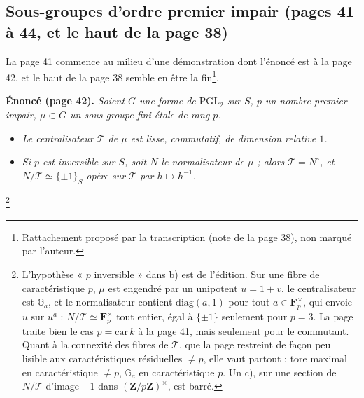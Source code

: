 \documentclass[11pt,a4paper]{article}
\begin{document}
\subsection*{Sous-groupes d'ordre premier impair (pages 41 à 44, et le haut de la page 38)}

La page 41 commence au milieu d'une démonstration dont l'énoncé est à la page
42, et le haut de la page 38 semble en être la fin\footnote{Rattachement proposé
par la transcription (note de la page 38), non marqué par l'auteur.}.

\textbf{Énoncé (page 42).} \emph{Soient $G$ une forme de $\mathrm{PGL}_2$ sur $S$, $p$ un
nombre premier impair, $\mu \subset G$ un sous-groupe fini étale de rang $p$.}
\begin{itemize}
  \item[a)] \emph{Le centralisateur $\mathcal{T}$ de $\mu$ est lisse, commutatif, de
    dimension relative $1$.}
  \item[b)] \emph{Si $p$ est inversible sur $S$, soit $N$ le normalisateur de $\mu$ ;
    alors $\mathcal{T} = N^{\circ}$, et $N/\mathcal{T} \simeq \{\pm 1\}_S$ opère sur $\mathcal{T}$
    par $h \mapsto h^{-1}$.}
\end{itemize}
\footnote{L'hypothèse « $p$ inversible » dans b) est de l'édition. Sur une fibre
de caractéristique $p$, $\mu$ est engendré par un unipotent $u = 1 + v$, le
centralisateur est $\mathbb{G}_a$, et le normalisateur contient
$\mathrm{diag}(a, 1)$ pour tout $a \in \mathbf{F}_p^{\times}$, qui envoie $u$ sur $u^a$ :
$N/\mathcal{T} \simeq \mathbf{F}_p^{\times}$ tout entier, égal à $\{\pm 1\}$ seulement pour
$p = 3$. La page traite bien le cas $p = \mathrm{car}\,k$ à la page 41, mais
seulement pour le commutant. Quant à la connexité des fibres de $\mathcal{T}$, que la
page restreint de façon peu lisible aux caractéristiques résiduelles $\neq p$,
elle vaut partout : tore maximal en caractéristique $\neq p$, $\mathbb{G}_a$ en
caractéristique $p$. Un c), sur une section de $N/\mathcal{T}$ d'image $-1$ dans
$(\mathbf{Z}/p\mathbf{Z})^{\times}$, est barré.}
\end{document}
